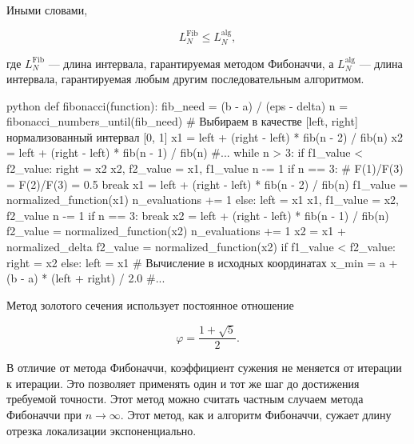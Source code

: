 Иными словами,

\[
L_N^{\mathrm{Fib}}
\leq
L_N^{\mathrm{alg}},
\]

где $L_N^{\mathrm{Fib}}$ --- длина интервала, гарантируемая методом
Фибоначчи, а $L_N^{\mathrm{alg}}$ --- длина интервала, гарантируемая
любым другим последовательным алгоритмом.

\begin{mintedbox}{python}
def fibonacci(function):
    fib_need = (b - a) / (eps - delta)
    n = fibonacci_numbers_until(fib_need)
    # Выбираем в качестве [left, right] нормализованный интервал [0, 1]
    x1 = left + (right - left) * fib(n - 2) / fib(n)
    x2 = left + (right - left) * fib(n - 1) / fib(n)
    #...
    while n > 3:
        if f1_value < f2_value:
            right = x2
            x2, f2_value = x1, f1_value
            n -= 1
            if n == 3: # F(1)/F(3) = F(2)/F(3) = 0.5
                break
            x1 = left + (right - left) * fib(n - 2) / fib(n)
            f1_value = normalized_function(x1)
            n_evaluations += 1
        else:
            left = x1
            x1, f1_value = x2, f2_value
            n -= 1
            if n == 3:
                break
            x2 = left + (right - left) * fib(n - 1) / fib(n)
            f2_value = normalized_function(x2)
            n_evaluations += 1
    x2 = x1 + normalized_delta
    f2_value = normalized_function(x2)
    if f1_value < f2_value:
        right = x2
    else:
        left = x1
    # Вычисление в исходных координатах
    x_min = a + (b - a) * (left + right) / 2.0
    #...
\end{mintedbox}

\newpage

Метод золотого сечения использует постоянное отношение

\[
\varphi = \frac{1+\sqrt{5}}{2}.
\]

В отличие от метода Фибоначчи, коэффициент сужения не меняется от итерации к
итерации. Это позволяет применять один и тот же шаг до достижения требуемой
точности. Этот метод можно считать частным случаем метода Фибоначчи
при $n \to \infty$. Этот метод, как и алгоритм Фибоначчи, сужает длину
отрезка локализации экспоненциально.

